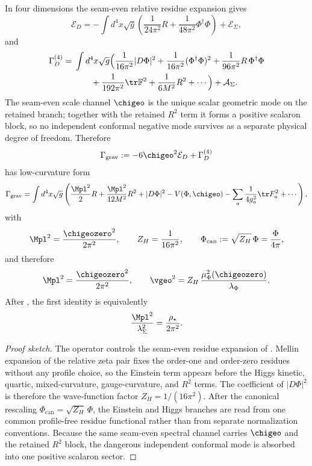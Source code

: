 \begin{theorem}
\label{prop:canonical-bosonic-normalization}
\label{thm:canonical-einstein-residue}
In four dimensions the seam-even relative residue expansion gives
\[
\mathcal E_D
=
-\int d^4x\sqrt g
\left(
\frac{1}{24\pi^2}R
+
\frac{1}{48\pi^2}\Phi^\dagger\Phi
\right)
+
\mathcal E_\Sigma,
\]
and
\[
\begin{aligned}
\Gamma_D^{(4)}
={}&
\int d^4x\sqrt g
\Big(
\frac{1}{16\pi^2}|D\Phi|^2
+\frac{1}{16\pi^2}(\Phi^\dagger\Phi)^2
+\frac{1}{96\pi^2}R\,\Phi^\dagger\Phi
\\
&\qquad
+\frac{1}{192\pi^2}\tr\mathbb F^2
+\frac{1}{6M^2}R^2
+\cdots
\Big)
+\mathcal A_\Sigma.
\end{aligned}
\]
The seam-even scale channel $\chigeo$ is the unique scalar geometric mode on the retained branch;
together with the retained $R^2$ term it forms a positive scalaron block, so no independent
conformal negative mode survives as a separate physical degree of freedom.
Therefore
\[
\Gamma_{\mathrm{grav}}
:=
-6\chigeo^2\mathcal E_D+\Gamma_D^{(4)}
\]
has low-curvature form
\[
\Gamma_{\mathrm{grav}}
=
\int d^4x\sqrt g
\left(
\frac{\Mpl^2}{2}R
+
\frac{\Mpl^2}{12M^2}R^2
+
|D\Phi|^2
-V(\Phi,\chigeo)
-\sum_a \frac{1}{4g_a^2}\tr F_a^2
+\cdots
\right),
\]
with
\[
\Mpl^2=\frac{\chigeozero^2}{2\pi^2},
\qquad
Z_H=\frac{1}{16\pi^2},
\qquad
\Phi_{\mathrm{can}}:=\sqrt{Z_H}\,\Phi=\frac{\Phi}{4\pi},
\]
and therefore
\begin{equation}
\label{eq:induced-einstein}
\Mpl^2=\frac{\chigeozero^2}{2\pi^2},
\qquad
\vgeo^2=Z_H\,\frac{\mu_\Phi^2(\chigeozero)}{\lambda_\Phi}.
\end{equation}
After , the first identity is equivalently
\[
\frac{\Mpl^2}{\lambda_\Sigma^2}=\frac{\rho_\star}{2\pi^2}.
\]
\end{theorem}

\begin{proof}[Proof sketch]
The operator  controls the seam-even residue expansion of
. Mellin expansion of the relative zeta pair fixes the order-one and
order-zero residues without any profile choice, so the Einstein term appears before the Higgs
kinetic, quartic, mixed-curvature, gauge-curvature, and $R^2$ terms. The coefficient of
$|D\Phi|^2$ is therefore the wave-function factor $Z_H=1/(16\pi^2)$. After the canonical rescaling
$\Phi_{\mathrm{can}}=\sqrt{Z_H}\,\Phi$, the Einstein and Higgs branches are read from one common
profile-free residue functional rather than from separate normalization conventions. Because the
same seam-even spectral channel carries $\chigeo$ and the retained $R^2$ block, the dangerous
independent conformal mode is absorbed into one positive scalaron sector.
\end{proof}

